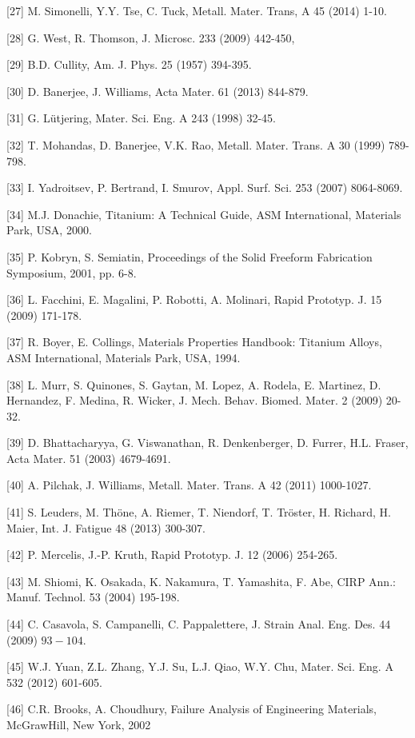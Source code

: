 \documentclass[10pt]{article}
\begin{document}
[27] M. Simonelli, Y.Y. Tse, C. Tuck, Metall. Mater. Trans, A 45 (2014) 1-10.

[28] G. West, R. Thomson, J. Microsc. 233 (2009) 442-450,

[29] B.D. Cullity, Am. J. Phys. 25 (1957) 394-395.

[30] D. Banerjee, J. Williams, Acta Mater. 61 (2013) 844-879.

[31] G. Lütjering, Mater. Sci. Eng. A 243 (1998) 32-45.

[32] T. Mohandas, D. Banerjee, V.K. Rao, Metall. Mater. Trans. A 30 (1999) 789-798.

[33] I. Yadroitsev, P. Bertrand, I. Smurov, Appl. Surf. Sci. 253 (2007) 8064-8069.

[34] M.J. Donachie, Titanium: A Technical Guide, ASM International, Materials Park, USA, 2000.

[35] P. Kobryn, S. Semiatin, Proceedings of the Solid Freeform Fabrication Symposium, 2001, pp. 6-8.

[36] L. Facchini, E. Magalini, P. Robotti, A. Molinari, Rapid Prototyp. J. 15 (2009) 171-178.

[37] R. Boyer, E. Collings, Materials Properties Handbook: Titanium Alloys, ASM International, Materials Park, USA, 1994.

[38] L. Murr, S. Quinones, S. Gaytan, M. Lopez, A. Rodela, E. Martinez, D. Hernandez, F. Medina, R. Wicker, J. Mech. Behav. Biomed. Mater. 2 (2009) 20-32.

[39] D. Bhattacharyya, G. Viswanathan, R. Denkenberger, D. Furrer, H.L. Fraser, Acta Mater. 51 (2003) 4679-4691.

[40] A. Pilchak, J. Williams, Metall. Mater. Trans. A 42 (2011) 1000-1027.

[41] S. Leuders, M. Thöne, A. Riemer, T. Niendorf, T. Tröster, H. Richard, H. Maier, Int. J. Fatigue 48 (2013) 300-307.

[42] P. Mercelis, J.-P. Kruth, Rapid Prototyp. J. 12 (2006) 254-265.

[43] M. Shiomi, K. Osakada, K. Nakamura, T. Yamashita, F. Abe, CIRP Ann.: Manuf. Technol. 53 (2004) 195-198.

[44] C. Casavola, S. Campanelli, C. Pappalettere, J. Strain Anal. Eng. Des. 44 (2009) $93-104$.

[45] W.J. Yuan, Z.L. Zhang, Y.J. Su, L.J. Qiao, W.Y. Chu, Mater. Sci. Eng. A 532 (2012) 601-605.

[46] C.R. Brooks, A. Choudhury, Failure Analysis of Engineering Materials, McGrawHill, New York, 2002
\end{document}
